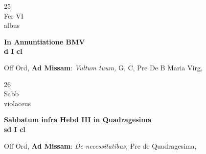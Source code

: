 \documentclass[10pt, openany]{book}
\begin{document}
        \begin{center}
            \begin{minipage}{3.5in}
                \vspace{2em}
                \begin{minipage}{0.5in}
                    {\Huge 25} \\
                    {\normalsize Fer VI} \\
                    {\normalsize albus}
                \end{minipage}
                \begin{minipage}{3.0in}
                    \textbf{ \large In Annuntiatione BMV \\
                    \textnormal{\normalsize d I cl}} \\ 
                \end{minipage}
                \begin{justify}Off Ord, \textbf{Ad Missam}: \textit{Vultum tuum,} G, C, Pre De B Maria Virg,  
                \end{justify}
            \end{minipage}
        \end{center}
    
        \begin{center}
            \begin{minipage}{3.5in}
                \vspace{2em}
                \begin{minipage}{0.5in}
                    {\Huge 26} \\
                    {\normalsize Sabb} \\
                    {\normalsize violaceus}
                \end{minipage}
                \begin{minipage}{3.0in}
                    \textbf{ \large Sabbatum infra Hebd III in Quadragesima \\
                    \textnormal{\normalsize sd I cl}} \\ 
                \end{minipage}
                \begin{justify}Off Ord, \textbf{Ad Missam}: \textit{De necessitatibus,} Pre de Quadragesima,  
                \end{justify}
            \end{minipage}
        \end{center}
    
\end{document}

